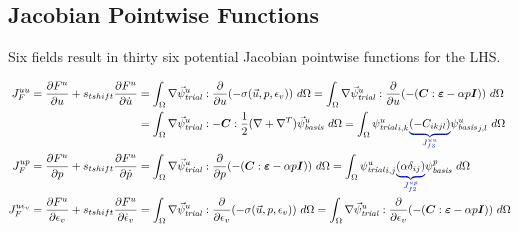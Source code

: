 \subsection{Jacobian Pointwise Functions}

Six fields result in thirty six potential Jacobian pointwise functions for the LHS.

\begin{align}
    J_F^{uu} = \frac{\partial F^u}{\partial u} + s_{tshift} \frac{\partial F^u}{\partial \dot{u}}                                   & = \int_{\Omega} \nabla \trialvec[u] : \frac{\partial}{\partial u} (- \sigma(\vec{u},p,\epsilon_{v})) \
    d\Omega = \int_{\Omega} \nabla \trialvec[u] : \frac{\partial}{\partial u} (-(\tensor{C}:\tensor{\varepsilon} -\alpha p \tensor{I})) \ d\Omega                                                                                                                                     \\
                                                                                                                                    & = \int_{\Omega} \nabla \trialvec[u] : -\tensor{C}: \frac{1}{2} (\nabla + \nabla^T) \basisvec[u] \ d\Omega = \int_{\Omega} \trialscalar[u]_{i,k}
    \eqnannotate{\left(-C_{ikjl}\right)}{J_{f3}^{uu}} \basisscalar[u]_{j,l} \ d\Omega                                                                                                                                                                                                 \\
    J_F^{up} = \frac{\partial F^u}{\partial p} + s_{tshift} \frac{\partial F^u}{\partial \dot{p}}                                   & = \int_{\Omega} \nabla \trialvec[u] : \frac{\partial}{\partial p}(-(\tensor{C}:\tensor{\varepsilon} -\alpha p \tensor{I})) \ d\Omega =
    \int_{\Omega} \trialscalar[u]_{i,j} \eqnannotate{\left(\alpha \delta_{ij}\right)}{J_{f2}^{up}} \basisscalar[p] \ d\Omega                                                                                                                                                          \\
    J_F^{u \epsilon_{v}} = \frac{\partial F^u}{\partial \epsilon_{v}} + s_{tshift} \frac{\partial F^u}{\partial \dot{\epsilon}_{v}} & = \int_{\Omega} \nabla \trialvec[u] : \frac{\partial}{\partial \epsilon_{v}}
    (-\sigma(\vec{u},p,\epsilon_{v})) \ d\Omega = \int_{\Omega} \nabla \trialvec[u] :
    \frac{\partial}{\partial \epsilon_{v}} (-(\tensor{C}:\tensor{\varepsilon} -\alpha p \tensor{I})) \ d\Omega                                                                                                                                                                        \\

\end{align}
